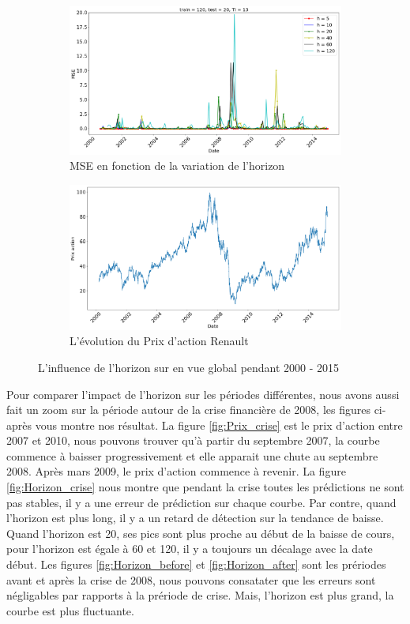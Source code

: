 \begin{figure}[H]
	\centering
	\begin{subfigure}{.5\textwidth}
	\includegraphics[width=.9\linewidth, scale=0.2]
	{plot/MSE_120_h_20.png}
	\caption{MSE en fonction de la variation de l'horizon}
	\label{fig:Horizon}
	\end{subfigure}%
	\begin{subfigure}{.5\textwidth}
	\centering
	\includegraphics[width=.9\linewidth, scale=0.2]
	{plot/Prix_action_global.png}
	\caption{L'évolution du Prix d'action Renault}
	\label{fig:Prix_action}
	\end{subfigure}
\caption{L'influence de l'horizon sur en vue global pendant 2000 - 2015}
\label{fig:ME_Trainingset}
\end{figure}

Pour comparer l'impact de l'horizon sur les périodes différentes, nous avons aussi fait un zoom sur la période autour de la crise financière de 2008, les figures ci-après vous montre nos résultat. La figure \ref{fig:Prix_crise} est le prix d'action entre 2007 et 2010, nous pouvons trouver qu'à partir du septembre 2007, la courbe commence à baisser progressivement et elle apparait une chute au septembre 2008. Après mars 2009, le prix d'action commence à revenir. La figure \ref{fig:Horizon_crise} nous montre que pendant la crise toutes les prédictions ne sont pas stables, il y a une erreur de prédiction sur chaque courbe. Par contre, quand l'horizon est plus long, il y a un retard de détection sur la tendance de baisse. Quand l'horizon est 20, ses pics sont plus proche au début de la baisse de cours, pour l'horizon est égale à 60 et 120, il y a toujours un décalage avec la date début. Les figures \ref{fig:Horizon_before} et \ref{fig:Horizon_after} sont les prériodes avant et après la crise de 2008, nous pouvons consatater que les erreurs sont négligables par rapports à la prériode de crise. Mais, l'horizon est plus grand, la courbe est plus fluctuante.

